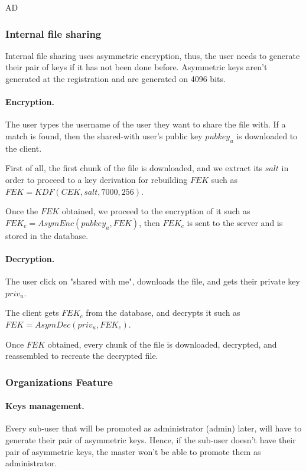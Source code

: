 AD\documentclass[a4paper,10pt]{article}
\begin{document}
\subsubsection{Internal file sharing}

Internal file sharing uses asymmetric encryption, thus, the user needs to generate their pair of
keys if it has not been done before. Asymmetric keys aren't generated at the registration and
are generated on 4096 bits.

\paragraph{Encryption.}

The user types the username of the user they want to share the file with. If a match is found, then the
shared-with user's public key $pubkey_u$ is downloaded to the client.

First of all, the first chunk of the file is downloaded, and we extract its $salt$ in order to proceed
to a key derivation for rebuilding $FEK$ such as $FEK=KDF(CEK, salt, 7000, 256)$.

Once the $FEK$ obtained, we proceed to the encryption of it such as $FEK_c=AsymEnc(pubkey_u, FEK)$, then
$FEK_c$ is sent to the server and is stored in the database.

\paragraph{Decryption.}

The user click on "shared with me", downloads the file, and gets their private key $priv_u$.

The client gets $FEK_c$ from the database, and decrypts it such as $FEK=AsymDec(priv_u, FEK_c)$.

Once $FEK$ obtained, every chunk of the file is downloaded, decrypted, and reassembled to recreate the
decrypted file.

\subsubsection{Organizations Feature}

\paragraph{Keys management.}

Every sub-user that will be promoted as administrator (admin) later, will have to generate their
pair of asymmetric keys. Hence, if the sub-user doesn't have their pair of asymmetric keys,
the master won't be able to promote them as administrator.
\end{document}
